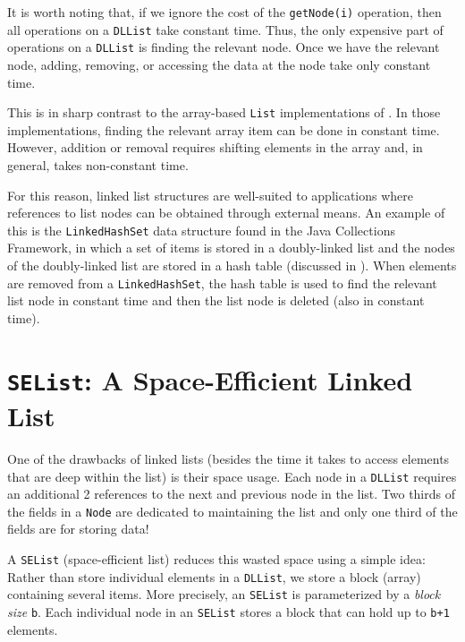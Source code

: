 It is worth noting that, if we ignore the cost of the \mbox{\texttt{getNode({\color{var}i})}}
operation, then all operations on a \mbox{\texttt{DLList}} take constant time.
Thus, the only expensive part of operations on a \mbox{\texttt{DLList}} is finding
the relevant node.  Once we have the relevant node, adding, removing,
or accessing the data at the node take only constant time.

This is in sharp contrast to the array-based \mbox{\texttt{List}} implementations of
. In those implementations, finding the relevant array
item can be done in constant time. However, addition or removal requires
shifting elements in the array and, in general, takes non-constant time.

For this reason, linked list structures are well-suited to applications
where references to list nodes can be obtained through external means.
An example of this is the \mbox{\texttt{LinkedHashSet}} data structure found in the
Java Collections Framework, in which a set of items is stored in a
doubly-linked list and the nodes of the doubly-linked list are stored
in a hash table (discussed in ).  When elements
are removed from a \mbox{\texttt{LinkedHashSet}}, the hash table is used to find the
relevant list node in constant time and then the list node is deleted
(also in constant time).


\section{\mbox{\texttt{SEList}}: A Space-Efficient Linked List}

One of the drawbacks of linked lists (besides the time it takes to
access elements that are deep within the list) is their space usage.
Each node in a \mbox{\texttt{DLList}} requires an additional 2 references to the next
and previous node in the list.  Two thirds of the fields in a \mbox{\texttt{Node}}
are dedicated to maintaining the list and only one third of the fields
are for storing data!

A \mbox{\texttt{SEList}} (space-efficient list) reduces this wasted space using
a simple idea: Rather than store individual elements in a \mbox{\texttt{DLList}},
we store a block (array) containing several items. More precisely, an
\mbox{\texttt{SEList}} is parameterized by a \emph{block size} \mbox{\texttt{{\color{var}b}}}. Each individual
node in an \mbox{\texttt{SEList}} stores a block that can hold up to \mbox{\texttt{{\color{var}b}+1}} elements.

